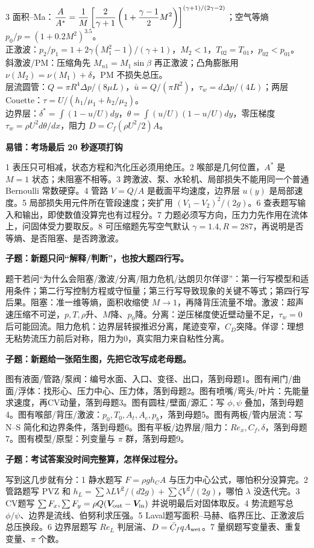 \documentclass[a4paper]{article}
\newcommand{\qt}[1]{\vspace{0.25pt}\colorbox{Q}{\parbox{\dimexpr\linewidth-2\fboxsep}{\color{white}\bfseries #1}}\par}
\newcommand{\ans}[1]{\colorbox{G}{\parbox{\dimexpr\linewidth-2\fboxsep}{#1}}\par}
\begin{document}
\begin{multicols}{3}
{面积--Ma：$\displaystyle {A\over A^*}={1\over M}\left[{2\over\gamma+1}\left(1+{\gamma-1\over2}M^2\right)\right]^{(\gamma+1)/(2\gamma-2)}$；空气等熵 $p_0/p=(1+0.2M^2)^{3.5}$。\\
正激波：$p_2/p_1=1+2\gamma(M_1^2-1)/(\gamma+1)$，$M_2<1$，$T_{02}=T_{01}$，$p_{02}<p_{01}$。\\
斜激波/PM：压缩角先 $M_{n1}=M_1\sin\beta$ 再正激波；凸角膨胀用 $\nu(M_2)=\nu(M_1)+\delta$，PM 不损失总压。\\
层流圆管：$Q=\pi R^4\Delta p/(8\mu L)$，$\bar u=Q/(\pi R^2)$，$\tau_w=d\Delta p/(4L)$；两层 Couette：$\tau=U/(h_1/\mu_1+h_2/\mu_2)$。\\
边界层：$\delta^*=\int(1-u/U)dy$，$\theta=\int(u/U)(1-u/U)dy$，零压梯度 $\tau_w=\rho U^2 d\theta/dx$，阻力 $D=C_f(\rho U^2/2)A$。}
\qt{易错：考场最后 20 秒逐项打钩}
\ans{1 表压只可相减，状态方程和汽化压必须用绝压。2 喉部是几何位置，$A^*$ 是 $M=1$ 状态；未阻塞不相等。3 跨激波、泵、水轮机、局部损失不能用同一个普通 Bernoulli 常数硬穿。4 管路 $V=Q/A$ 是截面平均速度，边界层 $u(y)$ 是局部速度。5 局部损失用元件所在管段速度；突扩用 $(V_1-V_2)^2/(2g)$。6 查表题写输入和输出，即使数值没算完也有过程分。7 力题必须写方向，压力力先作用在流体上，问固体受力要取反。8 可压缩题先写空气默认 $\gamma=1.4,R=287$，再说明是否等熵、是否阻塞、是否跨激波。}
\qt{子题：新题只问“解释/判断”，也按大题四行写。}
\ans{题干若问“为什么会阻塞/激波/分离/阻力危机/达朗贝尔佯谬”：第一行写模型和适用条件；第二行写控制方程或守恒量；第三行写导致现象的关键不等式；第四行写后果。阻塞：准一维等熵，面积收缩使 $M\to1$，再降背压流量不增。激波：超声速压缩不可逆，$p,T,\rho$升、$M$降、$p_0$降。分离：逆压梯度使近壁动量不足，$\tau_w=0$ 后可能回流。阻力危机：边界层转捩推迟分离，尾迹变窄，$C_D$突降。佯谬：理想无粘势流压力前后对称，阻力为0，真实阻力来自粘性分离。}
\qt{子题：新题给一张陌生图，先把它改写成老母题。}
\ans{图有液面/管路/泵阀：编号水面、入口、变径、出口，落到母题1。图有闸门/曲面/浮体：找形心、压力中心、压力体，落到母题2。图有喷嘴/弯头/叶片：先能量求速度，再CV动量，落到母题3。图有圆柱/壁面/源汇：写 $\phi,\psi$ 叠加，落到母题4。图有喉部/背压/激波：$p_0,T_0,A_t,A_e,p_b$，落到母题5。图有两板/管内层流：写 N--S 简化和边界条件，落到母题6。图有平板/边界层/阻力：$Re_x,C_f,\delta$，落到母题7。图有模型/原型：列变量与 $\pi$ 群，落到母题9。}
\qt{子题：考试答案没时间完整算，怎样保过程分。}
\ans{写到这几步就有分：1 静水题写 $F=\rho gh_CA$ 与压力中心公式，哪怕积分没算完。2 管路题写 PVZ 和 $h_L=\sum\lambda L V^2/(d2g)+\sum\zeta V^2/(2g)$，哪怕 $\lambda$ 没迭代完。3 CV题写 $\sum F_x,\sum F_y=\rho Q(\bm V_{\rm out}-\bm V_{\rm in})$ 并说明最后对固体取反。4 势流题写总 $\phi/\psi$、边界是流线、伯努利求压强。5 Laval题写面积--马赫、临界压比、正激波后总压换段。6 边界层题写 $Re_L$ 判层湍、$D=\bar C_f qA_{\rm wet}$。7 量纲题写变量表、重复变量、$\pi$ 个数。}

\end{multicols}
\end{document}
